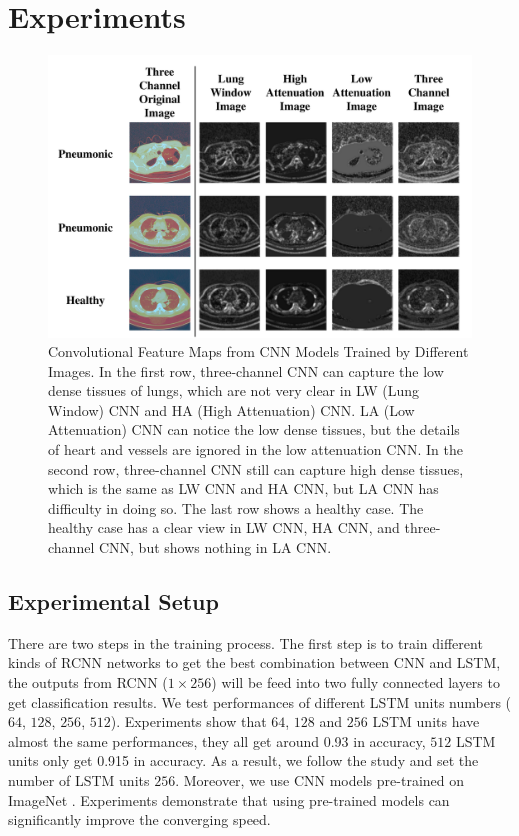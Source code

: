 \documentclass[journal]{IEEEtran}
\begin{document}
\section{Experiments}
\label{experiments}
\begin{figure}[t]
    \centerline{\includegraphics[width=150mm]{show.pdf}}
    \vspace{-0cm}
    \caption{Convolutional Feature Maps from CNN Models Trained by Different Images. In the first row, three-channel CNN can capture the low dense tissues of lungs, which are not very clear in LW (Lung Window) CNN and HA (High Attenuation) CNN. LA (Low Attenuation) CNN can notice the low dense tissues, but the details of heart and vessels are ignored in the low attenuation CNN. 
    In the second row, three-channel CNN still can capture high dense tissues, which is the same as LW CNN and HA CNN, but LA CNN has difficulty in doing so. The last row shows a healthy case. The healthy case has a clear view in LW CNN, HA CNN, and three-channel CNN, but shows nothing in LA CNN.}
    \vspace{-0cm}
    \label{show}
    \end{figure}

\subsection{Experimental Setup}
\label{experimentalsetup}
There are two steps in the training process.
The first step is to train different kinds of RCNN networks to get the best combination between CNN and LSTM, the outputs from RCNN ($1 \times 256$) will be feed into two fully connected layers to get classification results. 
We test performances of different LSTM units numbers ($64$, $128$, $256$, $512$). Experiments show that $64$, $128$ and $256$ LSTM units have almost the same performances, they all get around 0.93 in accuracy, $512$ LSTM units only get 0.915 in accuracy. As a result, we follow the study \cite{Donahue2015Long} and set the number of LSTM units $256$.
Moreover, we use CNN models pre-trained on ImageNet \cite{ILSVRC15}. Experiments demonstrate that using pre-trained models can significantly improve the converging speed. 
\end{document}

